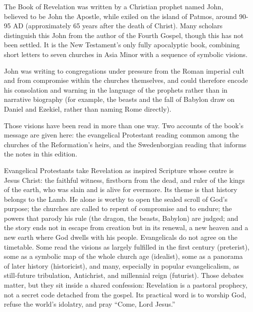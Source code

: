 
The Book of Revelation was written by a Christian prophet named John, believed to be John the Apostle, while exiled on the island of Patmos, around 90-95 AD (approximately 65 years after the death of Christ). Many scholars distinguish this John from the author of the Fourth Gospel, though this has not been settled. It is the New Testament's only fully apocalyptic book, combining short letters to seven churches in Asia Minor with a sequence of symbolic visions.

John was writing to congregations under pressure from the Roman imperial cult and from compromise within the churches themselves, and could therefore encode his consolation and warning in the language of the prophets rather than in narrative biography (for example, the beasts and the fall of Babylon draw on Daniel and Ezekiel, rather than naming Rome directly).

Those visions have been read in more than one way. Two accounts of the book's message are given here: the evangelical Protestant reading common among the churches of the Reformation's heirs, and the Swedenborgian reading that informs the notes in this edition.

\medskip
{}

Evangelical Protestants take Revelation as inspired Scripture whose centre is Jesus Christ: the faithful witness, firstborn from the dead, and ruler of the kings of the earth, who was slain and is alive for evermore. Its theme is that history belongs to the Lamb. He alone is worthy to open the sealed scroll of God's purpose; the churches are called to repent of compromise and to endure; the powers that parody his rule (the dragon, the beasts, Babylon) are judged; and the story ends not in escape from creation but in its renewal, a new heaven and a new earth where God dwells with his people. Evangelicals do not agree on the timetable. Some read the visions as largely fulfilled in the first century (preterist), some as a symbolic map of the whole church age (idealist), some as a panorama of later history (historicist), and many, especially in popular evangelicalism, as still-future tribulation, Antichrist, and millennial reign (futurist). Those debates matter, but they sit inside a shared confession: Revelation is a pastoral prophecy, not a secret code detached from the gospel. Its practical word is to worship God, refuse the world's idolatry, and pray ``Come, Lord Jesus.''

